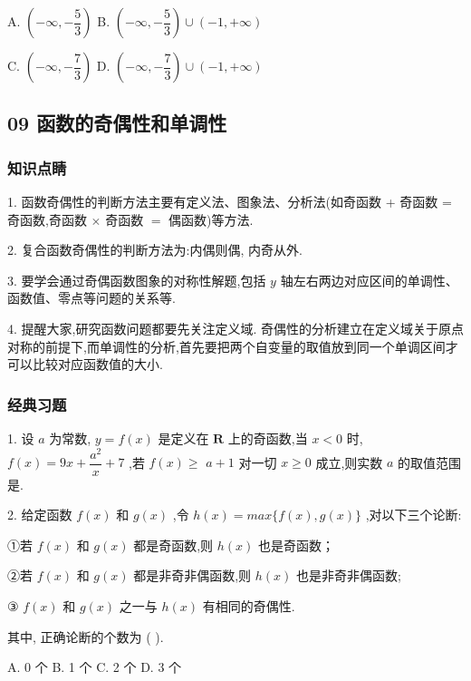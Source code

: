 A. $\left( {-\infty , - \dfrac{5}{3}}\right)$ B. $\left( {-\infty , - \dfrac{5}{3}}\right)  \cup  \left( {-1, + \infty }\right)$

C. $\left( {-\infty , - \dfrac{7}{3}}\right)$ D. $\left( {-\infty , - \dfrac{7}{3}}\right)  \cup  \left( {-1, + \infty }\right)$

\subsection*{09 函数的奇偶性和单调性}

\subsubsection*{知识点睛}

1. 函数奇偶性的判断方法主要有定义法、图象法、分析法(如奇函数 + 奇函数 = 奇函数,奇函数 $\times$ 奇函数 $=$ 偶函数)等方法.

2. 复合函数奇偶性的判断方法为:内偶则偶, 内奇从外.

3. 要学会通过奇偶函数图象的对称性解题,包括 $y$ 轴左右两边对应区间的单调性、函数值、零点等问题的关系等.

4. 提醒大家,研究函数问题都要先关注定义域. 奇偶性的分析建立在定义域关于原点对称的前提下,而单调性的分析,首先要把两个自变量的取值放到同一个单调区间才可以比较对应函数值的大小.

\subsubsection*{经典习题}

1. 设 $a$ 为常数, $y = f\left( x\right)$ 是定义在 $\mathbf{R}$ 上的奇函数,当 $x < 0$ 时, $f\left( x\right)  = {9x} + \dfrac{{a}^{2}}{x} + 7$ ,若 $f\left( x\right)  \geq$  $a + 1$ 对一切 $x \geq  0$ 成立,则实数 $a$ 的取值范围是\blkda{}.

2. 给定函数 $f\left( x\right)$ 和 $g\left( x\right)$ ,令 $h\left( x\right)  = max \{ f\left( x\right) ,g\left( x\right) \}$ ,对以下三个论断:

①若 $f\left( x\right)$ 和 $g\left( x\right)$ 都是奇函数,则 $h\left( x\right)$ 也是奇函数；

②若 $f\left( x\right)$ 和 $g\left( x\right)$ 都是非奇非偶函数,则 $h\left( x\right)$ 也是非奇非偶函数;

③ $f\left( x\right)$ 和 $g\left( x\right)$ 之一与 $h\left( x\right)$ 有相同的奇偶性.

其中, 正确论断的个数为 (   ).

A. 0 个 B. 1 个 C. 2 个 D. 3 个

